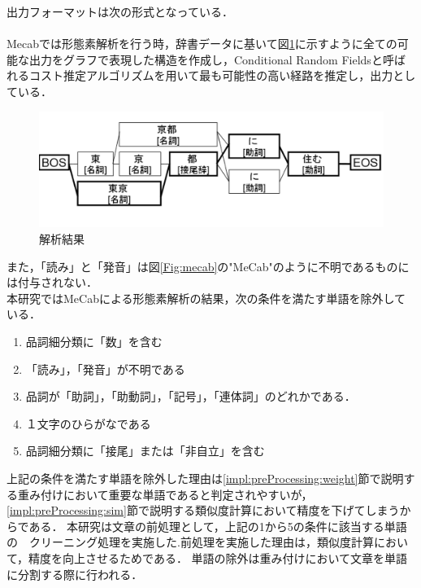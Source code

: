 出力フォーマットは次の形式となっている．\\
\\
Mecabでは形態素解析を行う時，辞書データに基いて図\ref{Fig:mecabLattice}に示すように全ての可能な出力をグラフで表現した構造を作成し，Conditional Random Fields\cite{CRF}と呼ばれるコスト推定アルゴリズムを用いて最も可能性の高い経路を推定し，出力としている．
\begin{figure}[htbp]
 \begin{center}
  \includegraphics[width=\textwidth]{../images/4.Implementation/lattice1.png}
  \caption{解析結果}
  \label{Fig:mecabLattice}
  \vspace{-10pt}
 \end{center}
\end{figure}
また，「読み」と「発音」は図\ref{Fig:mecab}の"MeCab"のように不明であるものには付与されない．\\
本研究ではMeCabによる形態素解析の結果，次の条件を満たす単語を除外している．
\begin{enumerate}
  \item 品詞細分類に「数」を含む
  \item 「読み」，「発音」が不明である
  \item 品詞が「助詞」，「助動詞」，「記号」，「連体詞」のどれかである． 
  \item １文字のひらがなである
  \item 品詞細分類に「接尾」または「非自立」を含む
\end{enumerate}
上記の条件を満たす単語を除外した理由は\ref{impl:preProcessing:weight}節で説明する重み付けにおいて重要な単語であると判定されやすいが，\ref{impl:preProcessing:sim}節で説明する類似度計算において精度を下げてしまうからである．
本研究は文章の前処理として，上記の1から5の条件に該当する単語の　クリーニング処理を実施した.前処理を実施した理由は，類似度計算において，精度を向上させるためである．
単語の除外は重み付けにおいて文章を単語に分割する際に行われる．

